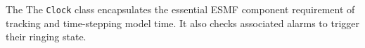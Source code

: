 
\label{sec:Clock}
The 
The {\tt Clock} class encapsulates the essential ESMF component requirement
of tracking and time-stepping model time.  It also checks associated alarms
to trigger their ringing state.
